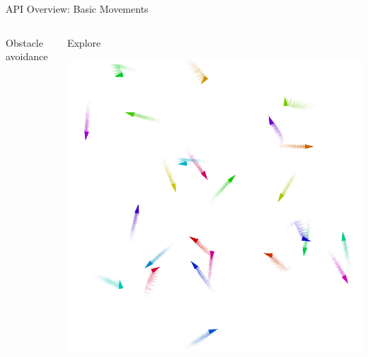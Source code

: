 \documentclass[presentation, 9pt]{beamer}\mode<presentation>{\usetheme{AMSBolognaFC}}
\begin{document}
\begin{frame}{API Overview: Basic Movements}
\begin{columns}
\begin{column}[t]{0.3\textwidth}
\begin{exampleblock}{Obstacle avoidance}
		\end{exampleblock}
	\end{column}
	\begin{column}[t]{0.3\textwidth}
		\begin{exampleblock}{Explore}
			
		\includegraphics[width=\textwidth]{img/explore-2.png}
		\end{exampleblock}
	\end{column}
\end{columns}
\end{frame}
\end{document}
